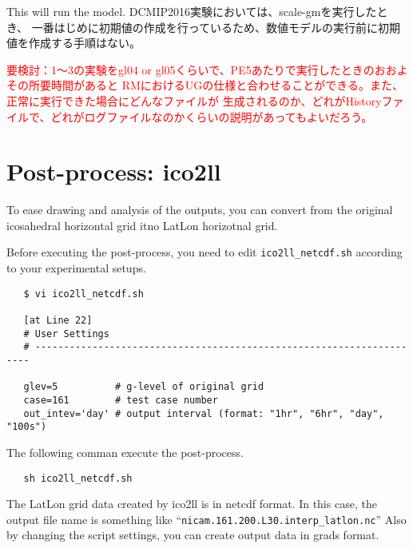 This will run the model.
DCMIP2016実験においては、scale-gmを実行したとき、
一番はじめに初期値の作成を行っているため、数値モデルの実行前に初期値を作成する手順はない。

\textcolor{red}{要検討：1〜3の実験をgl04 or gl05くらいで、PE5あたりで実行したときのおおよその所要時間があると
 RMにおけるUGの仕様と合わせることができる。また、正常に実行できた場合にどんなファイルが
 生成されるのか、どれがHistoryファイルで、どれがログファイルなのかくらいの説明があってもよいだろう。}



\section{Post-process: ico2ll}
To ease drawing and analysis of the outputs, you can convert 
from the original icosahedral horizontal grid itno LatLon horizotnal grid.

Before executing the post-process, you need to edit \verb|ico2ll_netcdf.sh|
according to your experimental setups.
 \begin{verbatim}
   $ vi ico2ll_netcdf.sh

   [at Line 22]
   # User Settings
   # ---------------------------------------------------------------------

   glev=5          # g-level of original grid
   case=161        # test case number
   out_intev='day' # output interval (format: "1hr", "6hr", "day", "100s")
 \end{verbatim}

 \noindent The following comman execute the post-process.
 \begin{verbatim}
   sh ico2ll_netcdf.sh
 \end{verbatim}


 \noindent The LatLon grid data created by ico2ll is in netcdf format. 
In this case, the output file name is something like 
``\verb|nicam.161.200.L30.interp_latlon.nc|''
Also by changing the script settings, you can create output data in 
grads format. 
